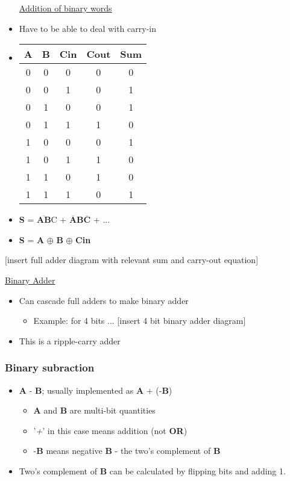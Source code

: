 \documentclass{article}
\begin{document}
\begin{itemize}
\underline{Addition of binary words}

\item Have to be able to deal with carry-in
\item 
\begin{tabular}{ c c c c c }
A & B & Cin & Cout & Sum \\ 
\hline
 0 & 0 & 0 & 0 & 0 \\  
 0 & 0 & 1 & 0 & 1 \\  
 0 & 1 & 0 & 0 & 1 \\  
 0 & 1 & 1 & 1 & 0 \\  
 1 & 0 & 0 & 0 & 1 \\  
 1 & 0 & 1 & 1 & 0 \\   
 1 & 1 & 0 & 1 & 0 \\  
 1 & 1 & 1 & 0 & 1 \\   
\end{tabular}
\item \textbf{S} = $\overline{\textbf{AB}}$C + $\overline{\textbf{A}}$\textbf{B}$\overline{\textbf{C}}$ + ...
\item \textbf{S} = \textbf{A} $\oplus$ \textbf{B} $\oplus$ \textbf{Cin}
\end{itemize}

[insert full adder diagram with relevant sum and carry-out equation]

\underline{Binary Adder}
\begin{itemize}
\item Can cascade full adders to make binary adder
\begin{itemize}
\item Example: for 4 bits ...
[insert 4 bit binary adder diagram]
\end{itemize}
\item This is a ripple-carry adder
\end{itemize}

\subsubsection{Binary subraction}
\begin{itemize}
\item \textbf{A} - \textbf{B}; usually implemented as \textbf{A} + (-\textbf{B})
\begin{itemize}
\item \textbf{A} and \textbf{B} are multi-bit quantities
\item '\textit{+}' in this case means addition (not \textbf{OR})
\item -\textbf{B} means negative \textbf{B} - the two's complement of \textbf{B}
\end{itemize}
\item Two's complement of \textbf{B} can be calculated by flipping bits and adding 1.
\end{itemize}
\end{document}
